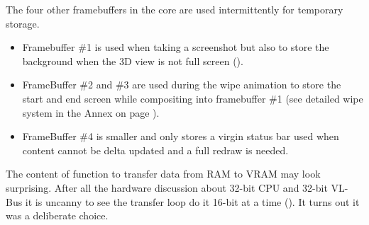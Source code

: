 \par
The four other framebuffers in the core are used intermittently for temporary storage.
\begin{itemize} 
\item Framebuffer \#1 is used when taking a screenshot but also to store the background when the 3D view is not full screen ().

\item FrameBuffer \#2 and \#3 are used during the wipe animation to store the start and end screen while compositing into framebuffer \#1 (see detailed wipe system in the Annex on page \pageref{label_melt}). 
\item FrameBuffer \#4 is smaller and only stores a virgin status bar used when content cannot be delta updated and a full redraw is needed. 
\end{itemize}
\par



The content of function  to transfer data from RAM to VRAM may look surprising. After all the hardware discussion about 32-bit CPU and 32-bit VL-Bus it is uncanny to see the transfer loop do it 16-bit at a time (). It turns out it was a deliberate choice.\\
\par
{}\\
\par
{}
\par
